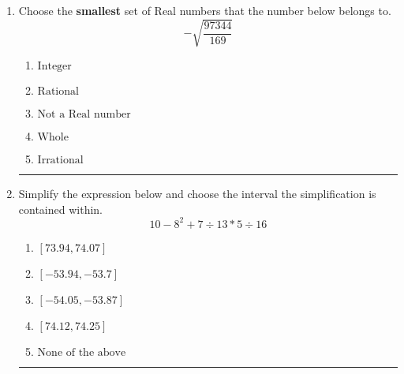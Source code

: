 \documentclass[14pt]{extbook}
\newcommand{\litem}[1]{\item#1\hspace*{-1cm}\rule{\textwidth}{0.4pt}}
\begin{document}
\begin{enumerate}
{\begin{enumerate}[label=\Alph*.]
\end{enumerate} }
\litem{
Choose the \textbf{smallest} set of Real numbers that the number below belongs to.\[ -\sqrt{\frac{97344}{169}} \]\begin{enumerate}[label=\Alph*.]
\item \( \text{Integer} \)
\item \( \text{Rational} \)
\item \( \text{Not a Real number} \)
\item \( \text{Whole} \)
\item \( \text{Irrational} \)

\end{enumerate} }
\litem{
Simplify the expression below and choose the interval the simplification is contained within.\[ 10 - 8^2 + 7 \div 13 * 5 \div 16 \]\begin{enumerate}[label=\Alph*.]
\item \( [73.94, 74.07] \)
\item \( [-53.94, -53.7] \)
\item \( [-54.05, -53.87] \)
\item \( [74.12, 74.25] \)
\item \( \text{None of the above} \)

\end{enumerate} }
\end{enumerate}
\end{document}
